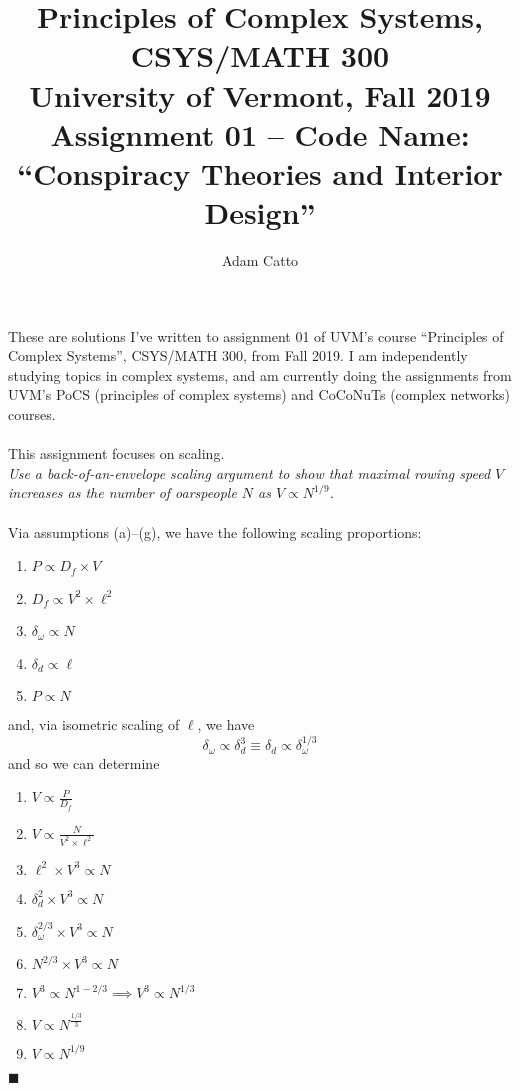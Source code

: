 \documentclass{article}[11pt]
\title{Principles of Complex Systems, CSYS/MATH 300\\
		University of Vermont, Fall 2019\\
		Assignment 01 – Code Name: ``Conspiracy Theories and Interior Design''}
\author{Adam Catto}
\begin{document}
\maketitle
These are solutions I've written to assignment 01 of UVM's course ``Principles of Complex Systems'', CSYS/MATH 300, from Fall 2019. I am independently studying topics in complex systems, and am currently doing the assignments from UVM's PoCS (principles of complex systems) and CoCoNuTs (complex networks) courses.\\
 \\
This assignment focuses on scaling.
\newpage
{}\\
\textit{Use a back-of-an-envelope scaling argument to show that maximal rowing speed $V$ increases as the number of oarspeople $N$ as $V \propto  N^{1/9}$.}\\ 
 \\
Via assumptions (a)–(g), we have the following scaling proportions:
\begin{enumerate}
	\item $P\propto D_f \times V$
	\item $D_f \propto V^2\times\ell^2$
	\item $\delta_{\omega} \propto N$
	\item $\delta_d \propto \ell$
	\item $P\propto N$
\end{enumerate}
and, via isometric scaling of $\ell$, we have 
$$ \delta_{\omega} \propto \delta_d^3 \equiv \delta_d \propto \delta_{\omega}^{1/3} $$
and so we can determine
\begin{enumerate}
	\item $V\propto \frac{P}{D_f} $
	\item $V\propto \frac{N}{V^2\times \ell^2}$
	\item $\ell^2\times V^3 \propto N$
	\item $\delta_d^2 \times V^3 \propto N$
	\item $\delta_{\omega}^{2/3}\times V^3 \propto N$
	\item $N^{2/3}\times V^3 \propto N$
	\item $V^3\propto N^{1-2/3} \implies V^3\propto N^{1/3}$
	\item $V\propto N^{\frac{1/3}{3}}$
	\item $V\propto N^{1/9}$
\end{enumerate}
\hfill $\blacksquare$\\
 \\ 
\end{document}
